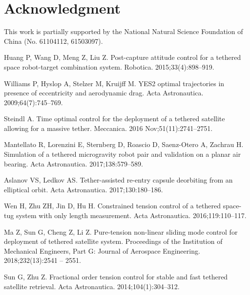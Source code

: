 \documentclass[ShortAfour]{sage}
\theoremstyle{plain}
\theoremstyle{remark}
\begin{document}
\section{Acknowledgment}
This work is partially supported by the National Natural Science Foundation of China (No. 61104112, 61503097).
%
%
\begin{thebibliography}{10}

  Huang P, Wang D, Meng Z, Liu Z.
  \newblock Post-capture attitude control for a tethered space robot-target
    combination system.
  \newblock Robotica. 2015;33(4):898--919.
  
  Williams P, Hyslop A, Stelzer M, Kruijff M.
  \newblock YES2 optimal trajectories in presence of eccentricity and aerodynamic
    drag.
  \newblock Acta Astronautica. 2009;64(7):745--769.
  
  Steindl A.
  \newblock Time optimal control for the deployment of a tethered satellite
    allowing for a massive tether.
  \newblock Meccanica. 2016 Nov;51(11):2741--2751.
   
  Mantellato R, Lorenzini E, Sternberg D, Roascio D, Saenz-Otero A, Zachrau H.
  \newblock Simulation of a tethered microgravity robot pair and validation on a
    planar air bearing.
  \newblock Acta Astronautica. 2017;138:579--589.
  
  Aslanov VS, Ledkov AS.
  \newblock Tether-assisted re-entry capsule deorbiting from an elliptical orbit.
  \newblock Acta Astronautica. 2017;130:180--186.
  
  Wen H, Zhu ZH, Jin D, Hu H.
  \newblock Constrained tension control of a tethered space-tug system with only
    length measurement.
  \newblock Acta Astronautica. 2016;119:110--117.
  
  Ma Z, Sun G, Cheng Z, Li Z.
  \newblock Pure-tension non-linear sliding mode control for deployment of
    tethered satellite system.
  \newblock Proceedings of the Institution of Mechanical Engineers, Part G:
    Journal of Aerospace Engineering. 2018;232(13):2541 -- 2551.
  
  Sun G, Zhu Z.
  \newblock Fractional order tension control for stable and fast tethered
    satellite retrieval.
  \newblock Acta Astronautica. 2014;104(1):304--312.
  

\end{thebibliography}
\end{document}
